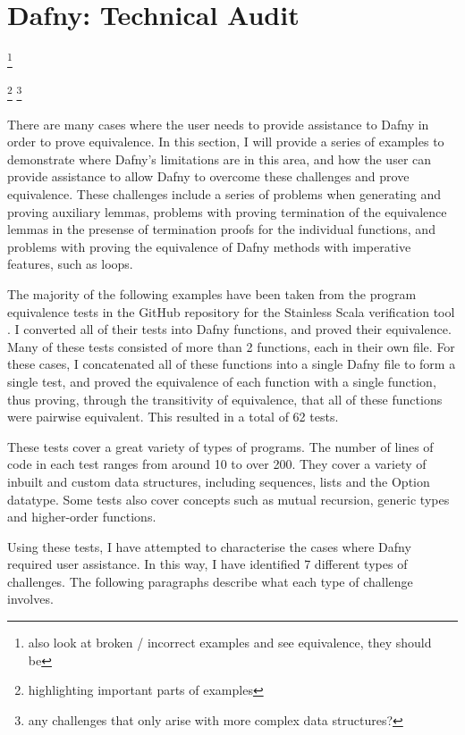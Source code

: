 \section{Dafny: Technical Audit}\label{sec:audit}

\footnote{also look at broken / incorrect examples and see equivalence, they should be}

\footnote{highlighting important parts of examples}
\footnote{any challenges that only arise with more complex data structures?}

There are many cases where the user needs to provide assistance to Dafny in order to prove equivalence. In this section, I will provide a series of examples to demonstrate where Dafny's limitations are in this area, and how the user can provide assistance to allow Dafny to overcome these challenges and prove equivalence. These challenges include a series of problems when generating and proving auxiliary lemmas, problems with proving termination of the equivalence lemmas in the presense of termination proofs for the individual functions, and problems with proving the equivalence of Dafny methods with imperative features, such as loops.

The majority of the following examples have been taken from the program equivalence tests in the GitHub repository for the Stainless Scala verification tool \parencite{StainlessFrontendsBenchmarks}. I converted all of their tests into Dafny functions, and proved their equivalence. Many of these tests consisted of more than 2 functions, each in their own file. For these cases, I concatenated all of these functions into a single Dafny file to form a single test, and proved the equivalence of each function with a single function, thus proving, through the transitivity of equivalence, that all of these functions were pairwise equivalent. This resulted in a total of 62 tests.

These tests cover a great variety of types of programs. The number of lines of code in each test ranges from around 10 to over 200. They cover a variety of inbuilt and custom data structures, including sequences, lists and the Option datatype. Some tests also cover concepts such as mutual recursion, generic types and higher-order functions.

Using these tests, I have attempted to characterise the cases where Dafny required user assistance. In this way, I have identified 7 different types of challenges. The following paragraphs describe what each type of challenge involves.

